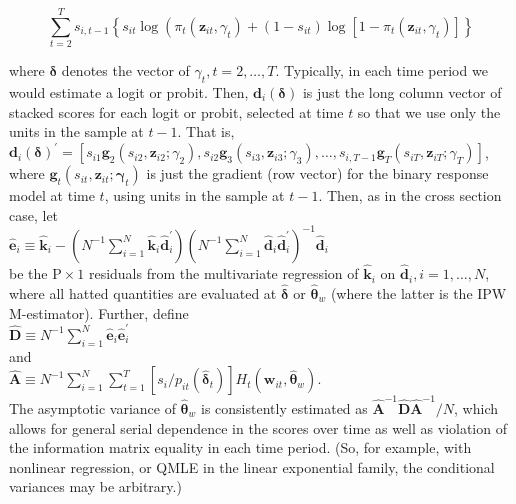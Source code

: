 \documentclass[10pt]{article}
\begin{document}
$$
\sum_{t=2}^{T} s_{i, t-1}\left\{s_{i t} \log \left(\pi_{t}\left(\mathbf{z}_{i t}, \gamma_{t}\right)+\left(1-s_{i t}\right) \log \left[1-\pi_{t}\left(\mathbf{z}_{i t}, \gamma_{t}\right)\right]\right\}\right.
$$

where $\boldsymbol{\delta}$ denotes the vector of $\gamma_{t}, t=2, \ldots, T$. Typically, in each time period we would estimate a logit or probit. Then, $\mathbf{d}_{i}(\boldsymbol{\delta})$ is just the long column vector of stacked scores for each logit or probit, selected at time $t$ so that we use only the units in the sample at $t-1$. That is,\\
$\mathbf{d}_{i}(\boldsymbol{\delta})^{\prime}=\left[s_{i 1} \mathbf{g}_{2}\left(s_{i 2}, \mathbf{z}_{i 2} ; \gamma_{2}\right), s_{i 2} \mathbf{g}_{3}\left(s_{i 3}, \mathbf{z}_{i 3} ; \gamma_{3}\right), \ldots, s_{i, T-1} \mathbf{g}_{T}\left(s_{i T}, \mathbf{z}_{i T} ; \gamma_{T}\right)\right]$,\\
where $\mathbf{g}_{t}\left(s_{i t}, \mathbf{z}_{i t} ; \boldsymbol{\gamma}_{t}\right)$ is just the gradient (row vector) for the binary response model at time $t$, using units in the sample at $t-1$. Then, as in the cross section case, let\\
$\hat{\mathbf{e}}_{i} \equiv \hat{\mathbf{k}}_{i}-\left(N^{-1} \sum_{i=1}^{N} \hat{\mathbf{k}}_{i} \hat{\mathbf{d}}_{i}^{\prime}\right)\left(N^{-1} \sum_{i=1}^{N} \hat{\mathbf{d}}_{i} \hat{\mathbf{d}}_{i}^{\prime}\right)^{-1} \hat{\mathbf{d}}_{i}$\\
be the $\mathrm{P} \times 1$ residuals from the multivariate regression of $\hat{\mathbf{k}}_{i}$ on $\hat{\mathbf{d}}_{i}, i=1, \ldots, N$, where all hatted quantities are evaluated at $\hat{\boldsymbol{\delta}}$ or $\hat{\boldsymbol{\theta}}_{w}$ (where the latter is the IPW M-estimator). Further, define\\
$\hat{\mathbf{D}} \equiv N^{-1} \sum_{i=1}^{N} \hat{\mathbf{e}}_{i} \hat{\mathbf{e}}_{i}^{\prime}$\\
and\\
$\hat{\mathbf{A}} \equiv N^{-1} \sum_{i=1}^{N} \sum_{t=1}^{T}\left[s_{i} / p_{i t}\left(\hat{\boldsymbol{\delta}}_{t}\right)\right] H_{t}\left(\mathbf{w}_{i t}, \hat{\boldsymbol{\theta}}_{w}\right)$.\\
The asymptotic variance of $\hat{\boldsymbol{\theta}}_{w}$ is consistently estimated as $\hat{\mathbf{A}}^{-1} \hat{\mathbf{D}} \hat{\mathbf{A}}^{-1} / N$, which allows for general serial dependence in the scores over time as well as violation of the information matrix equality in each time period. (So, for example, with nonlinear regression, or QMLE in the linear exponential family, the conditional variances may be arbitrary.)
\end{document}
